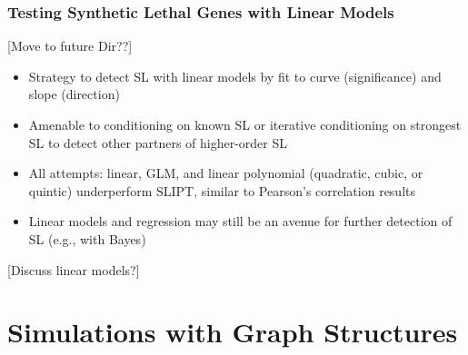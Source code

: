 \subsubsection{Testing Synthetic Lethal Genes with Linear Models}
\label{chap5:compare_linear_model}
[Move to future Dir??]

\begin{itemize}
 \item Strategy to detect SL with linear models by fit to curve (significance) and slope (direction)
 \item Amenable to conditioning on known SL or iterative conditioning on strongest SL to detect other partners of higher-order SL
 \item All attempts: linear, GLM, and linear polynomial (quadratic, cubic, or quintic) underperform \gls{SLIPT}, similar to Pearson's correlation results
 \item Linear models and regression may still be an avenue for further detection of SL (e.g., with Bayes)
\end{itemize}
\fi

[Discuss linear models?]


\iffalse
\section{Developing a linear model predictor of synthetic lethality}
\subsection{Linear models}
\subsection{Polynomial models}
\subsection{Conditioning}
\subsection{SLIPTv2}
\fi

\section{Simulations with Graph Structures}
\label{chap5:graphsim}

